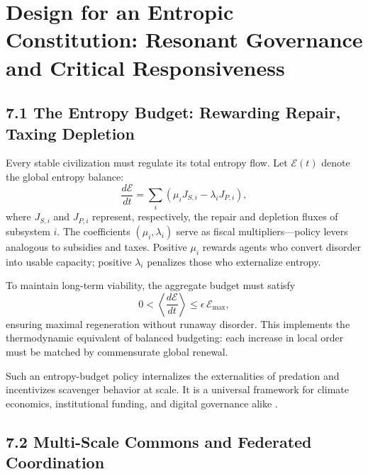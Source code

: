\documentclass[11pt,a4paper,titlepage]{article}
\theoremstyle{definition}
\begin{document}
\section{Design for an Entropic Constitution: Resonant Governance and Critical Responsiveness}
\label{sec:constitution}

\subsection{7.1 The Entropy Budget: Rewarding Repair, Taxing Depletion}

Every stable civilization must regulate its total entropy flow.  
Let $\mathcal{E}(t)$ denote the global entropy balance:
\begin{equation}
\frac{d\mathcal{E}}{dt}
   = \sum_{i} (\mu_i J_{S,i} - \lambda_i J_{P,i}),
\label{eq:entropy_budget}
\end{equation}
where $J_{S,i}$ and $J_{P,i}$ represent, respectively, the repair and depletion
fluxes of subsystem $i$.  
The coefficients $(\mu_i,\lambda_i)$ serve as fiscal multipliers—policy levers
analogous to subsidies and taxes.  
Positive $\mu_i$ rewards agents who convert disorder into usable capacity;
positive $\lambda_i$ penalizes those who externalize entropy.

To maintain long-term viability, the aggregate budget must satisfy
\begin{equation}
0 < \left\langle
      \frac{d\mathcal{E}}{dt}
     \right\rangle
  \le \epsilon\,\mathcal{E}_{\max},
\label{eq:budget_constraint}
\end{equation}
ensuring maximal regeneration without runaway disorder.  
This implements the thermodynamic equivalent of balanced budgeting:
each increase in local order must be matched by commensurate global renewal.

Such an entropy-budget policy internalizes the externalities of
predation and incentivizes scavenger behavior at scale.  
It is a universal framework for climate economics, institutional funding, and
digital governance alike \cite{ostrom1990,wiener1950,friston2022,baez2022}.

\subsection{7.2 Multi-Scale Commons and Federated Coordination}
\end{document}
